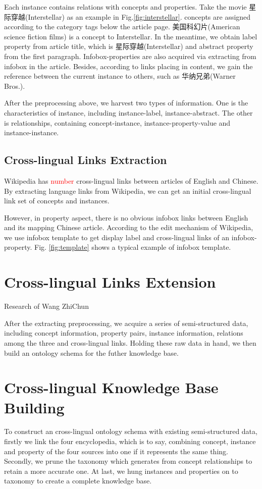 \documentclass[runningheads,a4paper]{llncs}
\begin{document}
Each instance contains relations with concepts and properties. Take the movie 星际穿越(Interstellar) as an example in Fig.\ref{fig:interstellar}. concepts are assigned according to the category tags below the article page. 美国科幻片(American science fiction films) is a concept to Interstellar. In the meantime, we obtain label property from article title, which is 星际穿越(Interstellar) and abstract property from the first paragraph. Infobox-properties are also acquired via extracting from infobox in the article. Besides, according to links placing in content, we gain the reference between the current instance to others, such as 华纳兄弟(Warner Bros.).

After the preprocessing above, we harvest two types of information. One is the characteristics of instance, including instance-label, instance-abstract. The other is relationships, containing concept-instance, instance-property-value and instance-instance.

\subsection{Cross-lingual Links Extraction}
\label{sec:cld}
Wikipedia has \textcolor{red}{number} cross-lingual links between articles of English and Chinese. By extracting language links from Wikipedia, we can get an initial cross-lingual link set of concepts and instances. 

However, in property aspect, there is no obvious infobox links between English and its mapping Chinese article. According to the edit mechanism of Wikipedia, we use infobox template to get display label and cross-lingual links of an infobox-property. Fig. \ref{fig:template} shows a typical example of infobox template. 

\section{Cross-lingual Links Extension}
\label{sec:cle}
Research of Wang ZhiChun

After the extracting preprocessing, we acquire a series of semi-structured data, including concept information, property pairs, instance information, relations among the three and cross-lingual links. Holding these raw data in hand, we then build an ontology schema for the futher knowledge base.

\section{Cross-lingual Knowledge Base Building}
To construct an cross-lingual ontology schema with existing semi-structured data, firstly we link the four encyclopedia, which is to say, combining concept, instance and property of the four sources into one if it represents the same thing. Secondly, we prune the taxonomy which generates from concept relationships to retain a more accurate one. At last, we hung instances and properties on to taxonomy to create a complete knowledge base.
\end{document}
